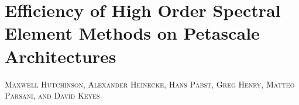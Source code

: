 \newcommand{\pluseq}{\mathrel{+}=}

\renewcommand{\ttdefault}{pcr}


\chapter{Efficiency of High Order Spectral Element Methods on Petascale Architectures}

\makeatletter
\newcommand{\chapterauthor}[1]{%
\begin{center}
 {\parindent0pt\vspace*{-25pt}%
  \linespread{1.1}\large\scshape#1%
  \par\nobreak\vspace*{35pt}}
\end{center}
  \@afterheading%
}
\makeatother

\vspace{20pt}

\chapterauthor{Maxwell Hutchinson, Alexander Heinecke, Hans Pabst, Greg Henry, Matteo Parsani, and David Keyes}


%
%



